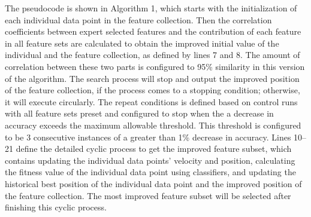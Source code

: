 \documentclass[12pt]{report}
\begin{document}
The pseudocode is shown in Algorithm 1, which starts with the initialization of each individual data point in the feature collection.  Then the correlation coefficients between expert selected features and the contribution of each feature in all feature sets are calculated to obtain the improved initial value of the individual and the feature collection, as defined by lines 7 and 8.  The amount of correlation between these two parts is configured to 95\% similarity in this version of the algorithm.  The search process will stop and output the improved position of the feature collection, if the process comes to a stopping condition; otherwise, it will execute circularly.  The repeat conditions is defined based on control runs with all feature sets preset and configured to stop when the a decrease in accuracy exceeds the maximum allowable threshold.  This threshold is configured to be 3 consecutive instances of a greater than 1\% decrease in accuracy.  Lines 10–21 define the detailed cyclic process to get the improved feature subset, which contains updating the individual data points’ velocity and position, calculating the fitness value of the individual data point using classifiers, and updating the historical best position of the individual data point and the improved position of the feature collection.  The most improved feature subset will be selected after finishing this cyclic process.

\end{document}
